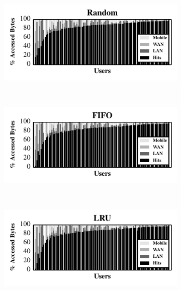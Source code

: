 \begin{figure}[t]

  \begin{subfigure}[t]{\columnwidth}

    \includegraphics{./figures/pocketlocker/RandomSimulatorPerformanceGraph.pdf}

  \end{subfigure}\\
  \begin{subfigure}[t]{\columnwidth}

    \includegraphics{./figures/pocketlocker/FIFOSimulatorPerformanceGraph.pdf}

  \end{subfigure}\\
  \begin{subfigure}[t]{\columnwidth}

    \includegraphics{./figures/pocketlocker/LRUSimulatorPerformanceGraph.pdf}


\end{subfigure}
\end{figure}
